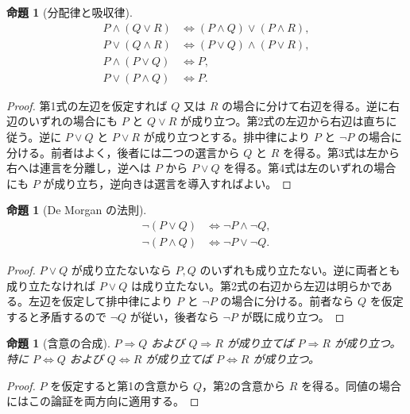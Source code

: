 \documentclass[a5paper,10pt,dvipdfmx]{jsarticle}
\theoremstyle{definition}
\theoremstyle{plain}
\newtheorem{prop}[ruledef]{命題}
\newcommand{\iffc}{\Longleftrightarrow}
\begin{document}
\begin{prop}[分配律と吸収律]
\begin{align*}
P\land(Q\lor R)&\iffc(P\land Q)\lor(P\land R),\\
P\lor(Q\land R)&\iffc(P\lor Q)\land(P\lor R),\\
P\land(P\lor Q)&\iffc P,\\
P\lor(P\land Q)&\iffc P.
\end{align*}
\end{prop}
\begin{proof}
第1式の左辺を仮定すれば $Q$ 又は $R$ の場合に分けて右辺を得る。逆に右辺のいずれの場合にも $P$ と $Q\lor R$ が成り立つ。第2式の左辺から右辺は直ちに従う。逆に $P\lor Q$ と $P\lor R$ が成り立つとする。排中律により $P$ と $\neg P$ の場合に分ける。前者はよく，後者には二つの選言から $Q$ と $R$ を得る。第3式は左から右へは連言を分離し，逆へは $P$ から $P\lor Q$ を得る。第4式は左のいずれの場合にも $P$ が成り立ち，逆向きは選言を導入すればよい。
\end{proof}
\begin{prop}[De Morgan の法則]
\begin{align*}
\neg(P\lor Q)&\iffc\neg P\land\neg Q,\\
\neg(P\land Q)&\iffc\neg P\lor\neg Q.
\end{align*}
\end{prop}
\begin{proof}
$P\lor Q$ が成り立たないなら $P,Q$ のいずれも成り立たない。逆に両者とも成り立たなければ $P\lor Q$ は成り立たない。第2式の右辺から左辺は明らかである。左辺を仮定して排中律により $P$ と $\neg P$ の場合に分ける。前者なら $Q$ を仮定すると矛盾するので $\neg Q$ が従い，後者なら $\neg P$ が既に成り立つ。
\end{proof}
\begin{prop}[含意の合成]
$P\Rightarrow Q$ および $Q\Rightarrow R$ が成り立てば $P\Rightarrow R$ が成り立つ。特に $P\Leftrightarrow Q$ および $Q\Leftrightarrow R$ が成り立てば $P\Leftrightarrow R$ が成り立つ。
\end{prop}
\begin{proof}
$P$ を仮定すると第1の含意から $Q$，第2の含意から $R$ を得る。同値の場合にはこの論証を両方向に適用する。
\end{proof}
\end{document}
